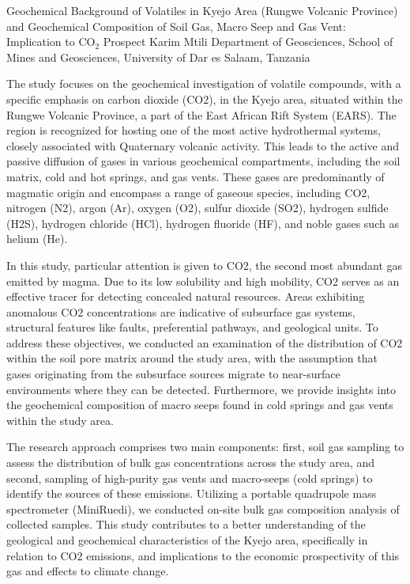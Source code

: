 \begin{conf-abstract}
{Geochemical Background of Volatiles in Kyejo Area (Rungwe Volcanic Province) and Geochemical Composition of Soil Gas, Macro Seep and Gas Vent: Implication to CO$_2$ Prospect}
{Karim Mtili}
{Department of Geosciences, School of Mines and Geosciences, University of Dar es Salaam, Tanzania}
{The study focuses on the geochemical investigation of volatile compounds, with a specific emphasis on carbon dioxide (CO2), in the Kyejo area, situated within the Rungwe Volcanic Province, a part of the East African Rift System (EARS). The region is recognized for hosting one of the most active hydrothermal systems, closely associated with Quaternary volcanic activity. This leads to the active and passive diffusion of gases in various geochemical compartments, including the soil matrix, cold and hot springs, and gas vents. These gases are predominantly of magmatic origin and encompass a range of gaseous species, including CO2, nitrogen (N2), argon (Ar), oxygen (O2), sulfur dioxide (SO2), hydrogen sulfide (H2S), hydrogen chloride (HCl), hydrogen fluoride (HF), and noble gases such as helium (He).

In this study, particular attention is given to CO2, the second most abundant gas emitted by magma. Due to its low solubility and high mobility, CO2 serves as an effective tracer for detecting concealed natural resources. Areas exhibiting anomalous CO2 concentrations are indicative of subsurface gas systems, structural features like faults, preferential pathways, and geological units. To address these objectives, we conducted an examination of the distribution of CO2 within the soil pore matrix around the study area, with the assumption that gases originating from the subsurface sources migrate to near-surface environments where they can be detected. Furthermore, we provide insights into the geochemical composition of macro seeps found in cold springs and gas vents within the study area.

The research approach comprises two main components: first, soil gas sampling to assess the distribution of bulk gas concentrations across the study area, and second, sampling of high-purity gas vents and macro-seeps (cold springs) to identify the sources of these emissions. Utilizing a portable quadrupole mass spectrometer (MiniRuedi), we conducted on-site bulk gas composition analysis of collected samples. This study contributes to a better understanding of the geological and geochemical characteristics of the Kyejo area, specifically in relation to CO2 emissions, and implications to the economic prospectivity of this gas and effects to climate change.
}
\end{conf-abstract}
